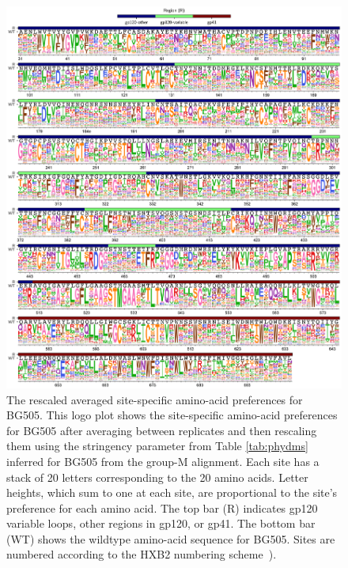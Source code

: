 \documentclass[9pt,lineno]{elife}
\begin{document}
\begin{figure}
\centerline{\includegraphics[width=6.5in]{figures/prefs_BG505/prefs_BG505.png}}
\caption{\label{fig:bg505_prefs_logo}
The rescaled averaged site-specific amino-acid preferences for BG505.
This logo plot shows the site-specific amino-acid preferences for BG505 after averaging between replicates and then rescaling them using the stringency parameter from Table \ref{tab:phydms} inferred for BG505 from the group-M alignment.
Each site has a stack of 20 letters corresponding to the 20 amino acids.
Letter heights, which sum to one at each site, are proportional to the site's preference for each amino acid.
The top bar (R) indicates gp120 variable loops, other regions in gp120, or gp41.
The bottom bar (WT) shows the wildtype amino-acid sequence for BG505.
Sites are numbered according to the HXB2 numbering scheme~\cite{korber1998numbering}).
}
\end{figure}
\end{document}
